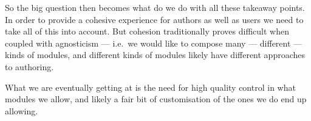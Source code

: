 So the big question then becomes what do we do with all these takeaway points. 
In order to provide a cohesive experience for authors as well as users we need 
to take all of this into account. But cohesion traditionally proves difficult 
when coupled with agnosticism --- i.e.\ we would like to compose many --- 
different --- kinds of modules, and different kinds of modules likely have 
different approaches to authoring.

What we are eventually getting at is the need for high quality control in what 
modules we allow, and likely a fair bit of customisation of the ones we do end 
up allowing.
